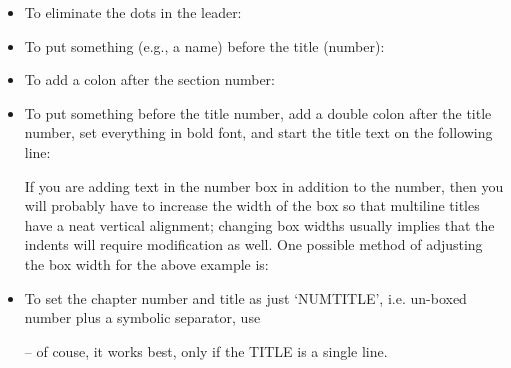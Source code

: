  \begin{itemize}
 \item To eliminate the dots in the leader:
 \begin{lcode}
 \renewcommand*{\cftKdotsep}{\cftnodots}
 \end{lcode}

 \item To put something (e.g., a name) before the title (number):
 \begin{lcode}
 \renewcommand*{\cftKname}{SOMETHING }
 \end{lcode}

 \item To add a colon after the section number:
 \begin{lcode}
 \renewcommand*{\cftKaftersnum}{:}
 \end{lcode}

 \item To put something before the title number, add a double colon after 
    the title number, set everything in bold font,
 and start the title text on the following line:
 \begin{lcode}
 \renewcommand*{\cftKfont}{\bfseries}
 \renewcommand*{\cftKleader}{\bfseries\cftdotfill{\cftKdotsep}}
 \renewcommand*{\cftKpagefont}{\bfseries}
 \renewcommand*{\cftKname}{SOMETHING }
 \renewcommand{\cftKaftersnum}{::}
 \renewcommand{\cftKaftersnumb}{\\}
 \end{lcode}

    If you are adding text in the number box in addition to the number,
 then you will probably have to increase the width of the box so that
 multiline titles have a neat vertical alignment; changing box widths
 usually implies that the indents will require modification as 
 well. One possible method of adjusting the box width for the above example
 is:
 \begin{lcode}
 \newlength{\mylen}                  %
 \settowidth{\mylen}{\bfseries\cftKaftersnum}
 \addtolength{\cftKnumwidth}{\mylen} %
 \end{lcode} 

\item To set the chapter number and title as just
  `NUM\enspace\textperiodcentered\enspace TITLE', i.e. un-boxed number
  plus a symbolic separator, use
  \begin{lcode}
  \renewcommand\cftchapteraftersnumb{\enspace\textperiodcentered\enspace}
  \renewcommand\chapternumberlinebox[2]{#2}  
  \end{lcode}
  -- of couse, it works best, only if the TITLE is a single line.



\end{itemize}
